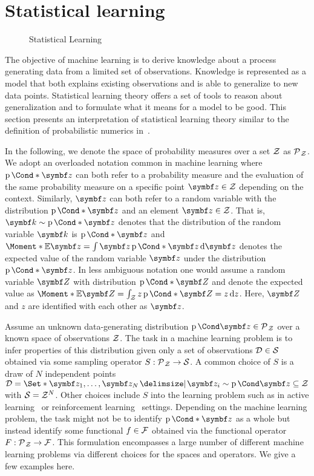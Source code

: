 \section{Statistical learning}
\label{toc:bayesian_ml:statistical_learning}
\begin{figure}[t]
    \centering
    \caption{
        Statistical Learning
        \label{fig:bayesian_ml:statistical_learning}
    }
\end{figure}
The objective of machine learning is to derive knowledge about a process generating data from a limited set of observations.
Knowledge is represented as a model that both explains existing observations and is able to generalize to new data points.
Statistical learning theory offers a set of tools to reason about generalization and to formulate what it means for a model to be good.
This section presents an interpretation of statistical learning theory similar to the definition of probabilistic numerics in~\parencite{oates_modern_2019,cockayne_bayesian_2019}.

In the following, we denote the space of probability measures over a set $\mathcal{Z}$ as $\operatorname{\mathcal{P}\mkern1mu}_{\mathcal{Z}}$.
We adopt an overloaded notation common in machine learning where $\Prob*{\mat{z}}$ can both refer to a probability measure and the evaluation of the same probability measure on a specific point $\mat{z} \in \Zc$ depending on the context.
Similarly, $\mat{z}$ can both refer to a random variable with the distribution $\Prob*{\mat{z}}$ and an element $\mat{z} \in \Zc$.
That is, $\mat{k} \sim \Prob*{\mat{z}}$ denotes that the distribution of the random variable $\mat{k}$ is $\Prob*{\mat{z}}$ and $\Moment*{\E}{\mat{z}} = \int \mat{z} \Prob*{\mat{z}} \diff \mat{z}$ denotes the expected value of the random variable $\mat{z}$ under the distribution $\Prob*{\mat{z}}$.
In less ambiguous notation one would assume a random variable $\mat{Z}$ with distribution $\Prob*{\mat{Z}}$ and denote the expected value as $\Moment*{\E}{\mat{Z}} = \int_{\Zc} z \Prob*{\mat{Z} = z} \diff z$.
Here, $\mat{Z}$ and $z$ are identified with each other as $\mat{z}$.

Assume an unknown data-generating distribution $\Prob{\mat{z}} \in \Probs{\Zc}$ over a known space of observations $\mathcal{Z}$.
The task in a machine learning problem is to infer properties of this distribution given only a set of observations $\mathcal{D} \in \mathcal{S}$ obtained via some sampling operator $S : \operatorname{\mathcal{P}\mkern1mu}_{\mathcal{Z}} \to \mathcal{S}$.
A common choice of $S$ is a draw of $N$ independent points $\Dc = \Set*{\mat{z_1}, \dots, \mat{z_N} \with \mat{z_i} \sim \Prob{\mat{z}}} \subseteq \Zc$ with $\mathcal{S} = \mathcal{Z}^N$.
Other choices include $S$ into the learning problem such as in active learning~\parencite{murphy_machine_2012} or reinforcement learning~\parencite{sutton_reinforcement_2018} settings.
Depending on the machine learning problem, the task might not be to identify $\Prob*{\mat{z}}$ as a whole but instead identify some functional $f \in \mathcal{F}$ obtained via the functional operator $F : \operatorname{\mathcal{P}\mkern1mu}_{\mathcal{Z}} \to \mathcal{F}$.
This formulation encompasses a large number of different machine learning problems via different choices for the spaces and operators.
We give a few examples here.

